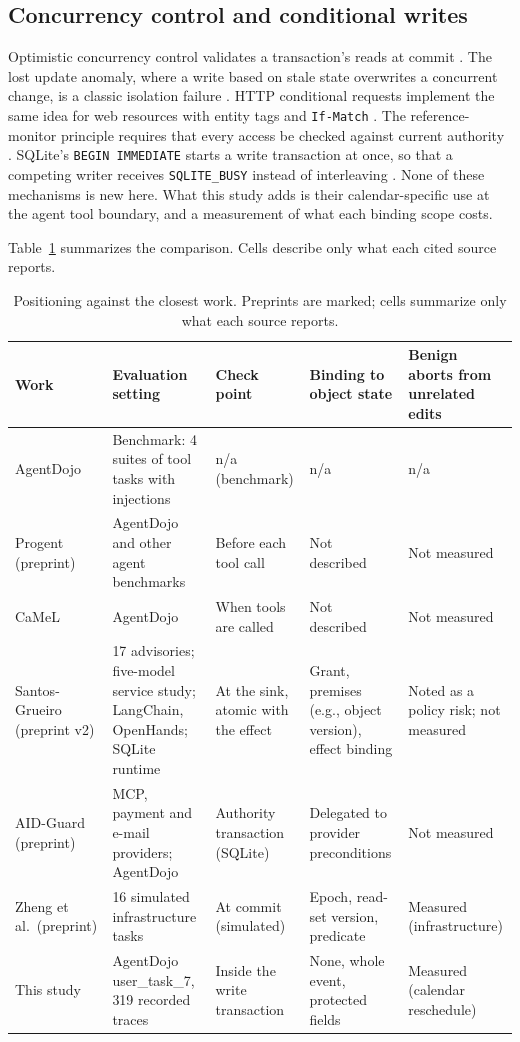 \subsection{Concurrency control and conditional writes}
Optimistic concurrency control validates a transaction's reads at commit \cite{kung1981}. The lost update anomaly, where a write based on stale state overwrites a concurrent change, is a classic isolation failure \cite{berenson1995}. HTTP conditional requests implement the same idea for web resources with entity tags and \texttt{If-Match} \cite{rfc9110}. The reference-monitor principle requires that every access be checked against current authority \cite{anderson1972,saltzer1975}. SQLite's \texttt{BEGIN IMMEDIATE} starts a write transaction at once, so that a competing writer receives \texttt{SQLITE\_BUSY} instead of interleaving \cite{sqlitetxn}. None of these mechanisms is new here. What this study adds is their calendar-specific use at the agent tool boundary, and a measurement of what each binding scope costs.

Table~\ref{tab:related} summarizes the comparison. Cells describe only what each cited source reports.

\begin{table}[t]
\caption{Positioning against the closest work. Preprints are marked; cells summarize only what each source reports.}
\label{tab:related}
\centering
\footnotesize
\begin{tabular}{p{2.9cm}p{3.2cm}p{2.5cm}p{2.9cm}p{3.9cm}}
\toprule
Work & Evaluation setting & Check point & Binding to object state & Benign aborts from unrelated edits \\
\midrule
AgentDojo \cite{agentdojo2024} & Benchmark: 4 suites of tool tasks with injections & n/a (benchmark) & n/a & n/a \\
Progent (preprint) \cite{progent2025} & AgentDojo and other agent benchmarks & Before each tool call & Not described & Not measured \\
CaMeL \cite{camel2025} & AgentDojo & When tools are called & Not described & Not measured \\
Santos-Grueiro (preprint v2) \cite{santosgrueiro2026} & 17 advisories; five-model service study; LangChain, OpenHands; SQLite runtime & At the sink, atomic with the effect & Grant, premises (e.g., object version), effect binding & Noted as a policy risk; not measured \\
AID-Guard (preprint) \cite{aidguard2026} & MCP, payment and e-mail providers; AgentDojo & Authority transaction (SQLite) & Delegated to provider preconditions & Not measured \\
Zheng et al.\ (preprint) \cite{zheng2026stale} & 16 simulated infrastructure tasks & At commit (simulated) & Epoch, read-set version, predicate & Measured (infrastructure) \\
This study & AgentDojo user\_task\_7, 319 recorded traces & Inside the write transaction & None, whole event, protected fields & Measured (calendar reschedule) \\
\bottomrule
\end{tabular}
\end{table}

